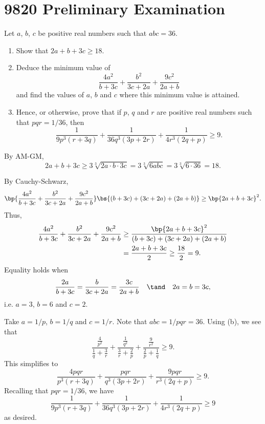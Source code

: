 \section{9820 Preliminary Examination}

\begin{problem}
    Let $a$, $b$, $c$ be positive real numbers such that $abc = 36$.

    \begin{enumerate}
        \item Show that $2a + b + 3c \geq 18$.
        \item Deduce the minimum value of \[\frac{4a^2}{b + 3c} + \frac{b^2}{3c + 2a} + \frac{9c^2}{2a + b}\] and find the values of $a$, $b$ and $c$ where this minimum value is attained.
        \item Hence, or otherwise, prove that if $p$, $q$ and $r$ are positive real numbers such that $pqr = 1/36$, then \[\frac1{9p^3 (r + 3q)} + \frac1{36q^3(3p+2r)} + \frac1{4r^3(2q+p)} \geq 9.\]
    \end{enumerate}
\end{problem}
\begin{solution}
    \begin{ppart}
        By AM-GM, \[2a + b + 3c \geq 3 \sqrt[3]{2a \cdot b \cdot 3c} = 3 \sqrt[3]{6abc} = 3\sqrt[3]{6 \cdot 36} = 18.\]
    \end{ppart}
    \begin{ppart}
        By Cauchy-Schwarz, \[\bp{\frac{4a^2}{b+3c} + \frac{b^2}{3c+2a} + \frac{9c^2}{2a+b}}\bs{(b+3c) + (3c+2a) + (2a+b)} \geq \bp{2a+b+3c}^2.\] Thus, 
        \begin{align*}
            \frac{4a^2}{b+3c} + \frac{b^2}{3c+2a} + \frac{9c^2}{2a+b} &\geq \frac{\bp{2a+b+3c}^2}{(b+3c) + (3c+2a) + (2a+b)}\\ 
            &= \frac{2a+b+3c}{2} \geq \frac{18}{2} = 9.
        \end{align*}
        Equality holds when \[\frac{2a}{b+3c} = \frac{b}{3c + 2a} = \frac{3c}{2a + b} \quad \tand \quad 2a = b = 3c,\] i.e. $a = 3$, $b = 6$ and $c = 2$.
    \end{ppart}
    \begin{ppart}
        Take $a = 1/p$, $b = 1/q$ and $c = 1/r$. Note that $abc = 1/pqr = 36$. Using (b), we see that \[\frac{\frac4{p^2}}{\frac1q + \frac3r} + \frac{\frac1{q^2}}{\frac3r + \frac2p} + \frac{\frac9{r^2}}{\frac2p + \frac1q} \geq 9.\] This simplifies to \[\frac{4pqr}{p^3 (r+3q)} + \frac{pqr}{q^3(3p+2r)} + \frac{9pqr}{r^3(2q+p)} \geq 9.\] Recalling that $pqr = 1/36$, we have \[\frac1{9p^3 (r + 3q)} + \frac1{36q^3(3p+2r)} + \frac1{4r^3(2q+p)} \geq 9\] as desired.
    \end{ppart}
\end{solution}

